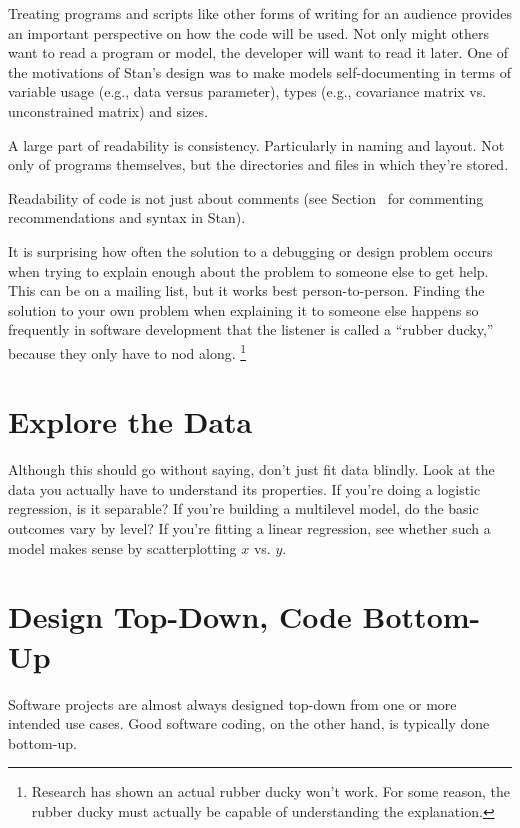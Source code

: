 Treating programs and scripts like other forms of writing for an
audience provides an important perspective on how the code will be
used.  Not only might others want to read a program or model, the
developer will want to read it later.  One of the motivations of
Stan's design was to make models self-documenting in terms of variable
usage (e.g., data versus parameter), types (e.g., covariance matrix
vs. unconstrained matrix) and sizes.  

A large part of readability is consistency.  Particularly in naming
and layout.  Not only of programs themselves, but the directories and
files in which they're stored.

Readability of code is not just about comments (see
Section~ for commenting
recommendations and syntax in Stan).

It is surprising how often the solution to a debugging or design
problem occurs when trying to explain enough about the problem to
someone else to get help.  This can be on a mailing list, but it works
best person-to-person.  Finding the solution to your own problem when
explaining it to someone else happens so frequently in software
development that the listener is called a ``rubber ducky,'' because
they only have to nod along.%
%
\footnote{Research has shown an actual rubber ducky won't work.  For
  some reason, the rubber ducky must actually be capable of
  understanding the explanation.}


\section{Explore the Data}

Although this should go without saying, don't just fit data blindly.
Look at the data you actually have to understand its properties.  If
you're doing a logistic regression, is it separable?  If you're
building a multilevel model, do the basic outcomes vary by level?  If
you're fitting a linear regression, see whether such a model makes
sense by scatterplotting $x$ vs. $y$.

\section{Design Top-Down, Code Bottom-Up}

Software projects are almost always designed top-down from one or more
intended use cases.  Good software coding, on the other hand, is
typically done bottom-up.  

